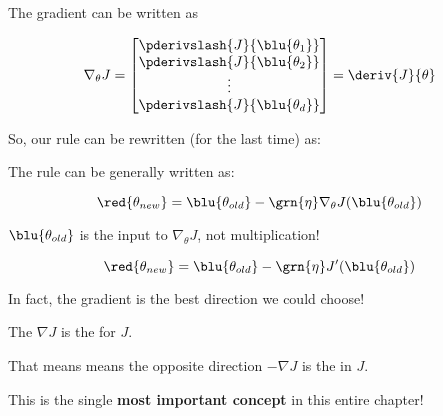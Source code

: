         \begin{definition}
            
            The gradient can be written as
            
            \begin{equation*}
                \nabla_\theta J 
                = 
                \begin{bmatrix}
                      \pderivslash{J}{ \blu{\theta_1} } \\ 
                      \pderivslash{J}{ \blu{\theta_2} } \\
                      \vdots \\
                      \pderivslash{J}{ \blu{\theta_d} } \\
                \end{bmatrix}
                =
                \deriv{J}{\theta}
            \end{equation*} 
        \end{definition}
        
        So, our rule can be rewritten (for the last time) as:\\
        
        \begin{kequation}
            The  rule can be generally written as:
            
            \begin{equation*}
                \red{ \theta_{new} } =  \blu{ \theta_{old} } 
                - \grn{ \eta } 
                \nabla_\theta J ( \blu{ \theta_{old} } )
            \end{equation*}
            
            $\blu{ \theta_{old} }$ is the input to $\nabla_\theta J$, not multiplication!
            
            \begin{equation*}
                \red{ \theta_{new} } =  \blu{ \theta_{old} } 
                - \grn{ \eta } 
                J'( \blu{ \theta_{old} } )
            \end{equation*}
        \end{kequation}
        
        In fact, the gradient is the best direction we could choose!
        
        \begin{concept}
            The  $\nabla J$ is the  for $J$.
            
            That means means the opposite direction $-\nabla J$ is the  in $J$.
        \end{concept}
        
        This is the single \textbf{most important concept} in this entire chapter!